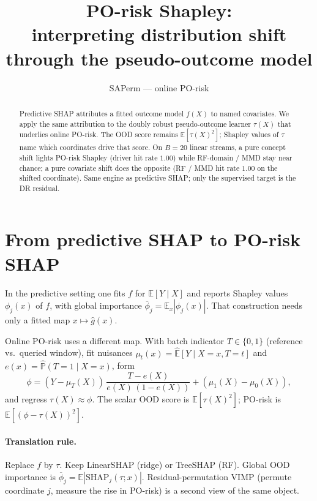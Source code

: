 \documentclass[11pt]{article}
\title{PO-risk Shapley:\\
interpreting distribution shift through the pseudo-outcome model}
\author{SAPerm --- online PO-risk}
\date{}
\begin{document}
\maketitle

\begin{abstract}
\noindent
Predictive SHAP attributes a fitted outcome model $f(X)$ to named
covariates. We apply the same attribution to the doubly robust
pseudo-outcome learner $\tau(X)$ that underlies online PO-risk.
The OOD score remains $\mathbb{E}[\tau(X)^2]$; Shapley values of
$\tau$ name which coordinates drive that score.
On $B{=}20$ linear streams, a pure concept shift lights PO-risk Shapley
(driver hit rate $1.00$) while RF-domain / MMD stay near chance; a pure
covariate shift does the opposite (RF / MMD hit rate $1.00$ on the
shifted coordinate). Same engine as predictive SHAP; only the supervised
target is the DR residual.
\end{abstract}

\section{From predictive SHAP to PO-risk SHAP}

In the predictive setting one fits $f$ for $\mathbb{E}[Y\mid X]$ and
reports Shapley values $\phi_j(x)$ of $f$, with global importance
$\overline{\phi}_j=\mathbb{E}_x|\phi_j(x)|$. That construction needs
only a fitted map $x\mapsto\widehat{g}(x)$.

Online PO-risk uses a different map. With batch indicator
$T\in\{0,1\}$ (reference vs.\ queried window), fit nuisances
$\mu_t(x)=\widehat{\mathbb{E}}[Y\mid X=x,T=t]$ and
$e(x)=\widehat{\mathbb{P}}(T=1\mid X=x)$, form
\begin{equation}
\label{eq:phi}
\phi
=
(Y-\mu_T(X))\,\frac{T-e(X)}{e(X)\,(1-e(X))}
+(\mu_1(X)-\mu_0(X)),
\end{equation}
and regress $\tau(X)\approx\phi$. The scalar OOD score is
$\mathbb{E}[\tau(X)^2]$; PO-risk is $\mathbb{E}[(\phi-\tau(X))^2]$.

\paragraph{Translation rule.}
Replace $f$ by $\tau$. Keep LinearSHAP (ridge) or TreeSHAP (RF).
Global OOD importance is $\overline{\phi}_j=\mathbb{E}|\mathrm{SHAP}_j(\tau;x)|$.
Residual-permutation VIMP (permute coordinate $j$, measure the rise in
PO-risk) is a second view of the same object.
\end{document}
